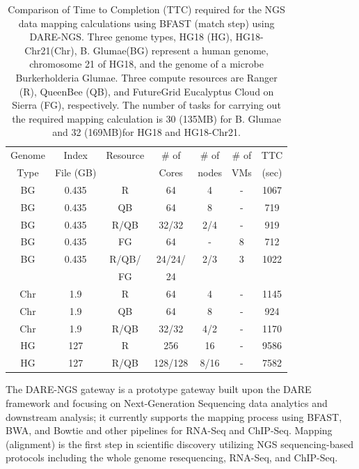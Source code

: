 \documentclass[]{svjour3}
\begin{document}
\begin{table}
\centering
\scriptsize
 \begin{tabular}{|c|c|c|c|c|c|c|} 
 \hline 
Genome & Index     & Resource  & \# of & \# of &  \# of     &	TTC \\
 Type        & File (GB)    & &Cores &  nodes & VMs& (sec)\\ 
 \hline
 BG &0.435& R&	64 &4&-	&1067 \\
\hline         
BG &0.435& QB	&	64& 8&-	&719 \\
\hline
 BG &0.435&R/QB	&	32/32 &2/4& -&919 \\
\hline
 BG &0.435& FG &	64 &-&8	&712 \\
\hline
 BG &0.435 & R/QB/ &	24/24/& 2/3 & 3 &1022\\
 & & FG& 24 &&&\\
\hline
\hline
Chr &1.9& R	&	64& 4 &-&1145 \\
\hline
Chr &1.9& QB	&	64&8&-	&924 \\
\hline
Chr &1.9& R/QB	&	32/32& 4/2&	-&1170 \\
\hline
\hline
HG &127& R	&	256 & 16 &-	&9586\\
\hline
HG &127& R/QB	&	128/128&8/16 & -&7582 \\
\hline
\end{tabular}
\caption{
 Comparison of Time to Completion (TTC) required for the NGS data
 mapping calculations using BFAST (match step) using DARE-NGS. 
 Three genome types,
 HG18 (HG), HG18-Chr21(Chr), B. Glumae(BG) represent a human genome,
 chromosome 21 of HG18, and the genome of a microbe Burkerholderia
 Glumae. Three compute resources are Ranger (R), QueenBee (QB), and
 FutureGrid Eucalyptus Cloud on Sierra (FG), respectively. The
 number of tasks for carrying out the required mapping calculation is
 30 (135MB) for B. Glumae and 32 (169MB)for HG18 and HG18-Chr21.
}

 \label{table:NGS-Distributed} 
\end{table}

The DARE-NGS gateway %
is a prototype gateway built upon the DARE framework and focusing on
Next-Generation Sequencing data analytics and downstream analysis; it
currently supports the mapping process using BFAST, BWA, and Bowtie
and other pipelines for RNA-Seq and
ChIP-Seq\cite{mardis2008-arghg,ecmls_ccpe10}. Mapping (alignment) is
the first step in scientific discovery utilizing NGS sequencing-based
protocols including the whole genome resequencing, RNA-Seq, and
ChIP-Seq.
\end{document}
